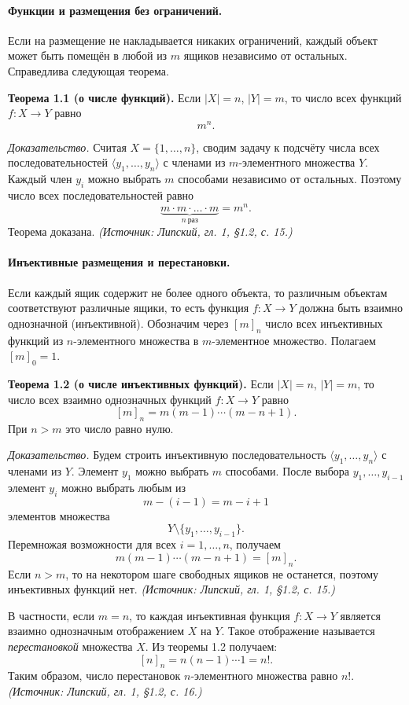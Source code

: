 \documentclass[a4paper,12pt]{article}
\begin{document}
\paragraph{Функции и размещения без ограничений.}
Если на размещение не накладывается никаких ограничений, каждый объект может быть помещён в любой из \(m\) ящиков независимо от остальных. Справедлива следующая теорема.

\textbf{Теорема 1.1 (о числе функций).} Если \(|X|=n\), \(|Y|=m\), то число всех функций \(f:X\to Y\) равно
\[
m^n.
\]

\emph{Доказательство.} Считая \(X=\{1,\dots,n\}\), сводим задачу к подсчёту числа всех последовательностей \(\langle y_1,\dots,y_n\rangle\) с членами из \(m\)-элементного множества \(Y\). Каждый член \(y_i\) можно выбрать \(m\) способами независимо от остальных. Поэтому число всех последовательностей равно
\[
\underbrace{m\cdot m\cdot\ldots\cdot m}_{n\ \text{раз}}=m^n.
\]
Теорема доказана.
\textit{(Источник: Липский, гл. 1, §1.2, с. 15.)}

\paragraph{Инъективные размещения и перестановки.}
Если каждый ящик содержит не более одного объекта, то различным объектам соответствуют различные ящики, то есть функция \(f:X\to Y\) должна быть взаимно однозначной (инъективной). Обозначим через \([m]_n\) число всех инъективных функций из \(n\)-элементного множества в \(m\)-элементное множество. Полагаем \([m]_0=1\).

\textbf{Теорема 1.2 (о числе инъективных функций).} Если \(|X|=n\), \(|Y|=m\), то число всех взаимно однозначных функций \(f:X\to Y\) равно
\[
[m]_n=m(m-1)\cdots(m-n+1).
\]
При \(n>m\) это число равно нулю.

\emph{Доказательство.} Будем строить инъективную последовательность \(\langle y_1,\dots,y_n\rangle\) с членами из \(Y\). Элемент \(y_1\) можно выбрать \(m\) способами. После выбора \(y_1,\dots,y_{i-1}\) элемент \(y_i\) можно выбрать любым из
\[
m-(i-1)=m-i+1
\]
элементов множества
\[
Y\setminus\{y_1,\dots,y_{i-1}\}.
\]
Перемножая возможности для всех \(i=1,\dots,n\), получаем
\[
m(m-1)\cdots(m-n+1)=[m]_n.
\]
Если \(n>m\), то на некотором шаге свободных ящиков не останется, поэтому инъективных функций нет.
\textit{(Источник: Липский, гл. 1, §1.2, с. 15.)}

В частности, если \(m=n\), то каждая инъективная функция \(f:X\to Y\) является взаимно однозначным отображением \(X\) на \(Y\). Такое отображение называется \emph{перестановкой} множества \(X\). Из теоремы 1.2 получаем:
\[
[n]_n=n(n-1)\cdots1=n!.
\]
Таким образом, число перестановок \(n\)-элементного множества равно \(n!\).
\textit{(Источник: Липский, гл. 1, §1.2, с. 16.)}
\end{document}

